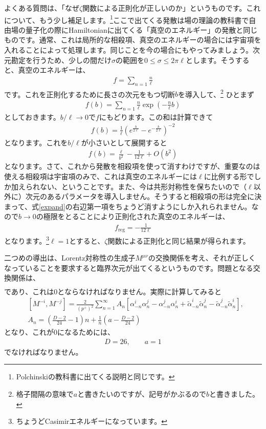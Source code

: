 \documentclass[report,paper=a4, fontsize=12pt, line_length=16cm, number_of_lines=34,dvipdfmx]{jlreq}
\numberwithin{equation}{chapter}
\numberwithin{equation}{section}
\newcommand{\alphat}{\tilde{\alpha}}
\begin{document}
よくある質問は、「なぜ$\zeta$関数による正則化が正しいのか」というものです。これについて、もう少し補足します。\footnote{Polchinskiの教科書に出てくる説明と同じです。}ここで出てくる発散は場の理論の教科書で自由場の量子化の際にHamiltonianに出てくる「真空のエネルギー」の発散と同じものです。通常、これは局所的な相殺項、真空のエネルギーの場合には宇宙項を入れることによって処理します。同じことを今の場合にもやってみましょう。次元勘定を行うため、少しの間だけ$\sigma$の範囲を$0\le \sigma \le 2\pi \ell$とします。そうすると、真空のエネルギーは、
\begin{align}
f=\sum_{n=1}\frac{n}{\ell}
\end{align}
です。これを正則化するために長さの次元をもつ切断$b$を導入して、\footnote{格子間隔の意味で$a$と書きたいのですが、記号がかぶるので$b$と書きました。}
ひとまず
\begin{align}
f(b)=\sum_{n=1}\frac{n}{\ell} \exp\left(-\frac{n}{\ell} b\right)
\end{align}
としておきます。$b/\ell \to 0$で$f$にもどります。この和は計算できて
\begin{align}
f(b)=\frac{1}{\ell}(e^{\frac{b}{2\ell}}-e^{-\frac{b}{2\ell}})^{-2}
\end{align}
となります。これを$b/\ell$が小さいとして展開すると
\begin{align}
f(b)=\frac{\ell}{b^2}-\frac{1}{12\ell}+O(b^2)\label{expand}
\end{align}
となります。さて、これから発散を相殺項を使って消すわけですが、重要なのは使える相殺項は宇宙項のみで、これは真空のエネルギーには$\ell$に比例する形でしか加えられない、ということです。また、今は共形対称性を保ちたいので（$\ell$以外に）次元のあるパラメータを導入しません。そうすると相殺項の形は完全に決まって、式\eqref{expand}の右辺第一項をちょうど消すようにしか入れられません。なので$b\to 0$の極限をとることにより正則化された真空のエネルギーは、
\begin{align}
f_{\mathrm{reg}}=-\frac{1}{12\ell}
\end{align}
となります。\footnote{ちょうどCasimirエネルギーになっています。}$\ell=1$とすると、$\zeta$関数による正則化と同じ結果が得られます。

二つめの導出は、Lorentz対称性の生成子$M^{\mu\nu}$の交換関係を考え、それが正しくなっていることを要求すると臨界次元が出てくるというものです。問題となる交換関係は、
\begin{align}
[M^{-i},M^{-j}]
\end{align}
であり、これは$0$とならなければなりません。実際に計算してみると
\begin{align}
&[M^{-i},M^{-j}]=\frac{2}{(p^{+})^2}\sum_{n=1}^{\infty}A_{n}
\left[
\alpha_{-n}^i\alpha_{n}^j
-\alpha_{-n}^j\alpha_{n}^i
+\alphat_{-n}^i\alphat_{n}^j
-\alphat_{-n}^j\alphat_{n}^i
\right],\nonumber\\
&A_n=\left(\frac{D-2}{24}-1\right)n+
\frac{1}{n}\left(a-\frac{D-2}{24}\right)
\end{align}
となり、これが$0$になるためには、
\begin{align}
D=26,\qquad a=1
\end{align}
でなければなりません。
\end{document}

